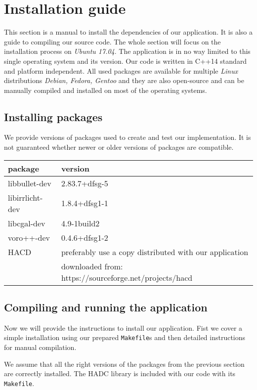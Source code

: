 \chapter*{Installation guide}

This section is a manual to install the dependencies of our application. It is also a guide to compiling our source code. The whole section will focus on the installation process on \emph{Ubuntu 17.04}. The application is in no way limited to this single operating system and its version. Our code is written in \emph{}{C++14} standard and platform independent. All used packages are available for multiple \emph{Linux} distributions \eg \emph{Debian, Fedora, Gentoo }  and they are also open-source and can be manually compiled and installed on most of the operating systems.

\section*{Installing packages}
We provide versions of packages used to create and test our implementation. It is not guaranteed whether newer or older versions of packages are compatible.
\begin{center}
\begin{tabular}{ |l|l| }
\hline
package & version \\
\hline
libbullet-dev & 2.83.7+dfsg-5 \\
libirrlicht-dev & 1.8.4+dfsg1-1 \\
libcgal-dev & 4.9-1build2 \\
voro++-dev & 0.4.6+dfsg1-2 \\
HACD & preferably use a copy distributed with our application\\
&downloaded from: https://sourceforge.net/projects/hacd\\
\hline
\end{tabular}
\end{center}

\section*{Compiling and running the application}
Now we will provide the instructions to install our application. Fist we cover a simple installation using our prepared {\tt Makefile}s and then detailed instructions for manual compilation.

We assume that all the right versions of the packages from the previous section are correctly installed. The HADC library is included with our code with its {\tt Makefile}.

